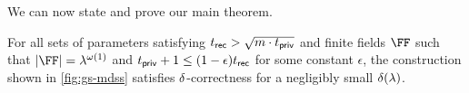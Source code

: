 
We can now state and prove our main theorem.
\begin{theorem}
	\label{thm:gs-mdss-correctness}
	For all sets of parameters satisfying $t_{\mathsf{rec}} > \sqrt{m \cdot t_{\mathsf{priv}}}$ and finite fields $\FF$ such that $|\FF| = \secpar^{\omega(1)}$ and $t_{\mathsf{priv}} + 1\leq (1 - \epsilon)t_{\mathsf{rec}}$ for some constant $\epsilon$, the construction shown in \cref{fig:gs-mdss} satisfies $\delta$-correctness for a negligibly small $\delta(\lambda)$.
\end{theorem}

\newcommand{\mdssCorrectSet}{\set{\mdssSecret_i \text{ s.t. } |\indexSet_i| \geq \mdssRecThr}}
\newcommand{\mdssShortRecon}{\mathsf{R}}
\newcommand{\mdssCS}{C}
\newcommand{\mdssG}{\mathsf{G}}
\newcommand{\mdssBPB}{\left\lceil\frac{\mdssMaxShares}{\mdssRecThr}\right\rceil \cdot \frac{\mdssRecThr^2}{2|\FF|}}

